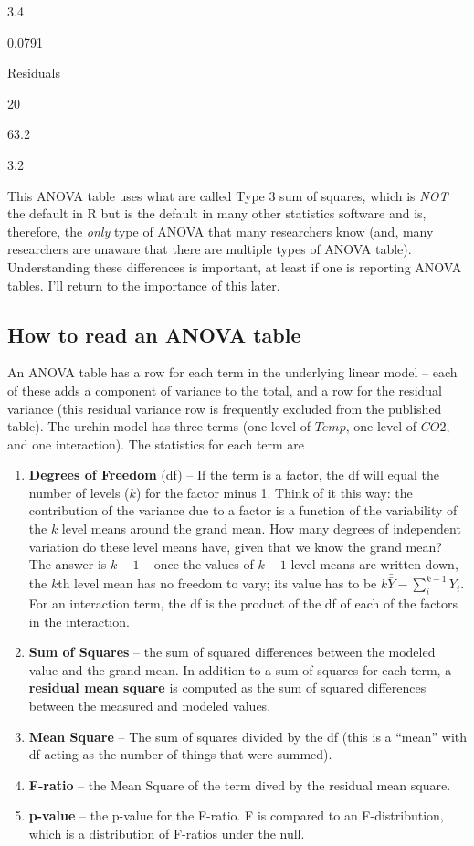 \documentclass[]{book}
\providecommand{\tightlist}{%
  \setlength{\itemsep}{0pt}\setlength{\parskip}{0pt}}
\begin{document}
3.4

0.0791

Residuals

20

63.2

3.2

This ANOVA table uses what are called Type 3 sum of squares, which is \emph{NOT} the default in R but is the default in many other statistics software and is, therefore, the \emph{only} type of ANOVA that many researchers know (and, many researchers are unaware that there are multiple types of ANOVA table). Understanding these differences is important, at least if one is reporting ANOVA tables. I'll return to the importance of this later.

\hypertarget{how-to-read-an-anova-table}{%
\subsection{How to read an ANOVA table}\label{how-to-read-an-anova-table}}

An ANOVA table has a row for each term in the underlying linear model -- each of these adds a component of variance to the total, and a row for the residual variance (this residual variance row is frequently excluded from the published table). The urchin model has three terms (one level of \(Temp\), one level of \(CO2\), and one interaction). The statistics for each term are

\begin{enumerate}
\def\labelenumi{\arabic{enumi}.}
\tightlist
\item
  \textbf{Degrees of Freedom} (df) -- If the term is a factor, the df will equal the number of levels (\(k\)) for the factor minus 1. Think of it this way: the contribution of the variance due to a factor is a function of the variability of the \(k\) level means around the grand mean. How many degrees of independent variation do these level means have, given that we know the grand mean? The answer is \(k-1\) -- once the values of \(k-1\) level means are written down, the \(k\)th level mean has no freedom to vary; its value has to be \(k\bar{\bar{Y}} - \sum_i^{k-1}{Y_i}\). For an interaction term, the df is the product of the df of each of the factors in the interaction.
\item
  \textbf{Sum of Squares} -- the sum of squared differences between the modeled value and the grand mean. In addition to a sum of squares for each term, a \textbf{residual mean square} is computed as the sum of squared differences between the measured and modeled values.
\item
  \textbf{Mean Square} -- The sum of squares divided by the df (this is a ``mean'' with df acting as the number of things that were summed).
\item
  \textbf{F-ratio} -- the Mean Square of the term dived by the residual mean square.
\item
  \textbf{p-value} -- the p-value for the F-ratio. F is compared to an F-distribution, which is a distribution of F-ratios under the null.
\end{enumerate}
\end{document}
